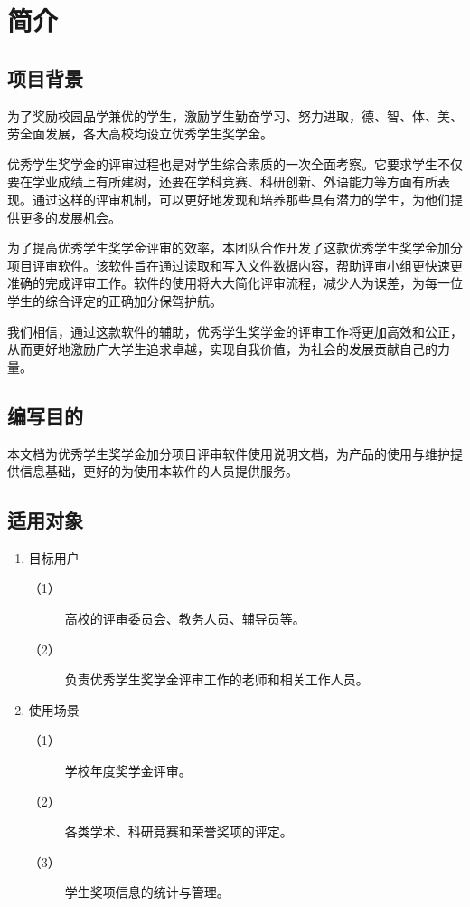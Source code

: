 \documentclass[12pt]{report}
\begin{document}
	
	\chapter{简介}	%
	\setcounter{page}{1} %
	\section{项目背景}
	为了奖励校园品学兼优的学生，激励学生勤奋学习、努力进取，德、智、体、美、劳全面发展，各大高校均设立优秀学生奖学金。
	
	优秀学生奖学金的评审过程也是对学生综合素质的一次全面考察。它要求学生不仅要在学业成绩上有所建树，还要在学科竞赛、科研创新、外语能力等方面有所表现。通过这样的评审机制，可以更好地发现和培养那些具有潜力的学生，为他们提供更多的发展机会。
	
	为了提高优秀学生奖学金评审的效率，本团队合作开发了这款优秀学生奖学金加分项目评审软件。该软件旨在通过读取和写入文件数据内容，帮助评审小组更快速更准确的完成评审工作。软件的使用将大大简化评审流程，减少人为误差，为每一位学生的综合评定的正确加分保驾护航。
	
	我们相信，通过这款软件的辅助，优秀学生奖学金的评审工作将更加高效和公正，从而更好地激励广大学生追求卓越，实现自我价值，为社会的发展贡献自己的力量。
	
	\section{编写目的}
	
	本文档为优秀学生奖学金加分项目评审软件使用说明文档，为产品的使用与维护提供信息基础，更好的为使用本软件的人员提供服务。
	
	\section{适用对象}
	\begin{enumerate}
		\item 目标用户
		\begin{description}
			\item[（1）] 高校的评审委员会、教务人员、辅导员等。
			\item[（2）] 负责优秀学生奖学金评审工作的老师和相关工作人员。
		\end{description}
		\item 使用场景
			\begin{description}
			\item[（1）] 学校年度奖学金评审。
			\item[（2）] 各类学术、科研竞赛和荣誉奖项的评定。
			\item[（3）] 学生奖项信息的统计与管理。
			\end{description}
	\end{enumerate}
	
\end{document}
